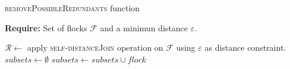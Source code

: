 \documentclass{article}
\begin{document}
    \begin{algorithm} \caption{\textsc{removePossibleRedundants} function}
        \textbf{Require:} Set of flocks $\mathcal F$ and a minimun distance $\varepsilon$.
        \begin{algorithmic}[1]
            \State $\mathcal R \gets $ apply \textsc{self-distanceJoin} operation on $\mathcal F$ using $\varepsilon$ as distance constraint. 
            \State $subsets \gets \emptyset$
                            \State $subsets \gets subsets \cup flock$
                        \EndIf
                    \EndIf
                \EndFor
            \EndFor
            \State {}
        \EndFunction
        \end{algorithmic}
    \end{algorithm}
\end{document}
